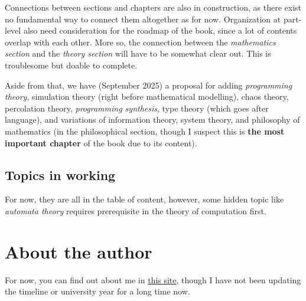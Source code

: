 Connections between sections and chapters are also in construction, as there exist no fundamental way to connect them altogether as for now. Organization at part-level also need consideration for the roadmap of the book, since a lot of contents overlap with each other. More so, the connection between the \textit{mathematics section} and the \textit{theory section} will have to be somewhat clear out. This is troublesome but doable to complete. 

Aside from that, we have (September 2025) a proposal for adding \textit{programming theory}, simulation theory (right before mathematical modelling), chaos theory, percolation theory, \textit{programming synthesis}, type theory (which goes after language), and variations of information theory, system theory, and philosophy of mathematics (in the philosophical section, though I suspect this is \textbf{the most important chapter} of the book due to its content). 
\subsection{Topics in working}
For now, they are all in the table of content, however, some hidden topic like \textit{automata theory} requires prerequisite in the theory of computation first. 

\section{About the author}

For now, you can find out about me in \href{https://amane-fujimiya.github.io/}{this site}, though I have not been updating the timeline or university year for a long time now. 